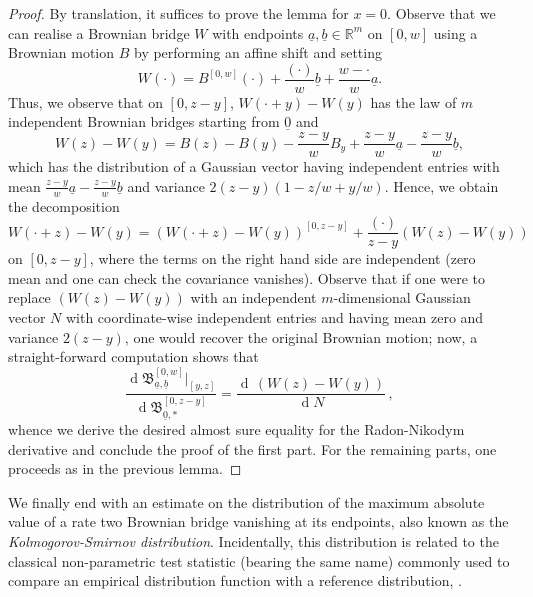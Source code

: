 \documentclass[11pt, reqno]{amsart}
\numberwithin{equation}{section}
\newcommand{\R}{\ensuremath{\mathbb{R}}}
\newcommand{\diff}{\ensuremath{\operatorname{d}\!}}
\begin{document}
\begin{proof}
    By translation, it suffices to prove the lemma for $x=0$. Observe that we can realise a Brownian bridge $W$ with endpoints $\underline{a}, \underline{b}\in \R^m$ on $[0,w]$ using a Brownian motion $B$ by performing an affine shift and setting
    $$
    W(\cdot) = B^{[0, w]}(\cdot)+\frac{(\cdot)}{w}\underline{b} + \frac{w-\cdot}{w}\underline{a} .
    $$
    Thus, we observe that on $[0,z-y]$, $W(\cdot+y)-W(y)$ has the law of $m$ independent Brownian bridges starting from $\underline{0}$ and  
    $$
    W(z)-W(y) = B(z)-B(y)-\frac{z-y}{w}B_y + \frac{z-y}{w}\underline{a}-\frac{z-y}{w}\underline{b},
    $$
    which has the distribution of a Gaussian vector having independent entries with mean $\frac{z-y}{w}\underline{a}-\frac{z-y}{w}\underline{b}$ and variance $2(z-y)(1-z/w+y/w)$. 
    Hence, we obtain the decomposition
    \begin{equation*}
    W(\cdot+z)-W(y) = (W(\cdot+z)-W(y))^{[0,z-y]} +  \frac{(\cdot)}{z-y}(W(z)-W(y))
    \end{equation*}
    on $[0, z-y]$, where the terms on the right hand side are independent (zero mean and one can check the covariance vanishes). Observe that if one were to replace $(W(z)-W(y))$ with an independent $m$-dimensional Gaussian vector $N$ with coordinate-wise independent entries and having mean zero and variance $2(z-y)$, one would recover the original Brownian motion; now, a straight-forward computation shows that
    \begin{equation}
        \frac{\diff\mathfrak{B}^{[0, w]}_{\underline{a}, \underline{b}}|_{[y,z]}}{\diff\mathfrak{B}^{[0, z-y]}_{\underline{0}, *}} = \frac{\diff\, (W(z)-W(y))}{\diff N}\,,
    \end{equation}
    whence we derive the desired almost sure equality for the Radon-Nikodym derivative and conclude the proof of the first part. For the remaining parts, one proceeds as in the previous lemma.
\end{proof}

We finally end with an estimate on the distribution of the maximum absolute value of a rate two Brownian bridge vanishing at its endpoints, also known as the \emph{Kolmogorov-Smirnov distribution}. Incidentally, this distribution is related to the classical non-parametric
test statistic (bearing the same name) commonly used to compare an empirical distribution function with a reference
distribution, \cite{berger2014kolmogorov}.
\end{document}
